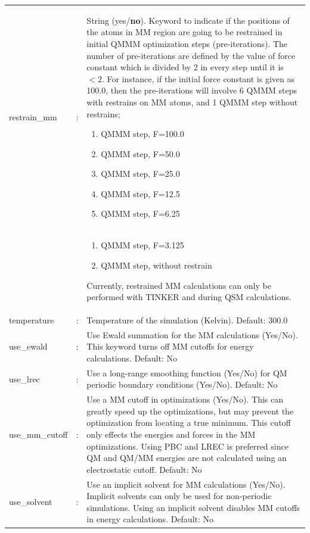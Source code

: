 \documentclass[12pt]{report}
\begin{document}
\begin{center}
\begin{longtable}{ p{4cm} c p{12.5cm}}
restrain\_mm & :  & 
String (yes/\textbf{no}). 
Keyword to indicate if 
the positions of the atoms in 
MM region are going to be 
restrained in initial QMMM 
optimization steps (pre-iterations). 
The number of pre-iterations are 
defined by the value of force constant 
which is divided by 2 in every step 
until it is $<2$. For instance, if the 
initial force 
constant is given as 100.0, 
then the pre-iterations 
will involve 6 QMMM steps with 
restrains on MM atoms,
and 1 
QMMM step without restrains;\newline 
\begin{enumerate}
\item QMMM step, F=100.0
\item QMMM step, F=50.0
\item QMMM step, F=25.0
\item QMMM step, F=12.5
\item QMMM step, F=6.25
    \newcounter{enumTemp}
    \setcounter{enumTemp}{\theenumi}
\end{enumerate} \\
&  &\vspace*{-18pt}
\begin{enumerate}
 \setcounter{enumi}{\theenumTemp}
\item QMMM step, F=3.125
\item QMMM step, without restrain
\end{enumerate}    
Currently, restrained MM calculations can only 
be performed with TINKER and during QSM calculations. \newline \\

temperature & : & Temperature of the simulation (Kelvin).
Default: 300.0 \newline\\

use\_ewald & : & Use Ewald summation for the MM calculations (Yes/No).
This keyword turns off MM cutoffs for energy calculations.
Default: No \newline\\

use\_lrec & : & Use a long-range smoothing function (Yes/No) for QM periodic
boundary conditions (Yes/No).
Default: No \newline\\

use\_mm\_cutoff & : & Use a MM cutoff in optimizations (Yes/No).
This can greatly speed up the optimizations, but may prevent the optimization
from locating a true minimum.
This cutoff only effects the energies and forces in the MM optimizations.
Using PBC and LREC is preferred since QM and QM/MM energies are not calculated
using an electrostatic cutoff.
Default: No \newline\\

use\_solvent & : & Use an implicit solvent for MM calculations (Yes/No).
Implicit solvents can only be used for non-periodic simulations.
Using an implicit solvent disables MM cutoffs in energy calculations.
Default: No 
\end{longtable}
\end{center}
\vspace*{-6pt}
\end{document}
